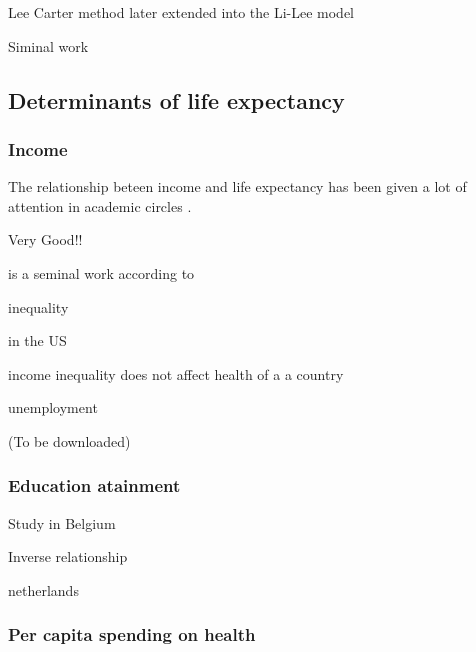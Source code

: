 \documentclass[10pt,a4paper]{article}
\begin{document}
Lee Carter method \cite{Shang2011} later extended into the Li-Lee model

Siminal work \cite{Lee1992}

\cite{Bongaarts2005}

\subsection{Determinants of life expectancy}



\subsubsection{Income}

The relationship beteen income and life expectancy has been given a lot of attention in academic circles \citep{Preston1975, Hu2015, Chetty2016, Oeppen2019}.











\cite{Kalwij2014}

\cite{Oeppen2019} Very Good!!

\cite{Preston1975} is a seminal work according to \cite{Oeppen2019}

inequality \cite{Hu2015}

\cite{Chetty2016} in the US

income inequality does not affect health of a a country \cite{JasonBeckfield2004}

unemployment \cite{Bonamore2015} \cite{Roelfs2011} \cite{Roelfs2015} 

\cite{Tarkiainen2012} (To be downloaded)

\subsubsection{Education atainment}

Study in Belgium \cite{Deboosere2009}


Inverse relationship  \cite{Hoque2019}

netherlands \cite{VanKippersluis2009}

\cite{VanBaal2016a}

\subsubsection{Per capita spending on health}
\end{document}
